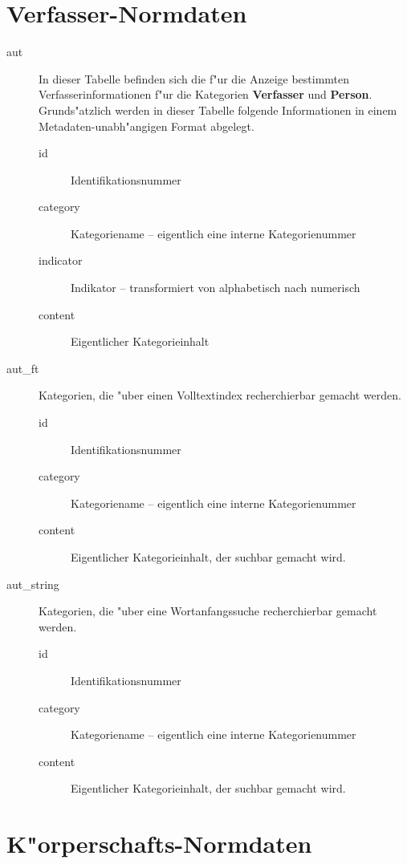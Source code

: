 \documentclass[11pt, twoside, a4paper, BCOR8mm, DIV12, bibtotoc,idxtotoc]{scrbook}
\begin{document}
\begin{itemize}
\section{Verfasser-Normdaten}

\begin{description}
\item[aut] In dieser Tabelle befinden sich die f"ur die Anzeige
  bestimmten Verfasserinformationen f"ur die Kategorien
  \textbf{Verfasser} und \textbf{Person}. Grunds"atzlich werden in
  dieser Tabelle folgende Informationen in einem
  Metadaten-unabh"angigen Format abgelegt.
  \begin{description}
  \item[id] Identifikationsnummer
  \item[category] Kategoriename -- eigentlich eine interne Kategorienummer
  \item[indicator] Indikator -- transformiert von alphabetisch nach numerisch
  \item[content] Eigentlicher Kategorieinhalt
  \end{description}
\item[aut\_ft] Kategorien, die "uber einen Volltextindex recherchierbar
  gemacht werden.
  \begin{description}
  \item[id] Identifikationsnummer
  \item[category] Kategoriename -- eigentlich eine interne Kategorienummer
  \item[content] Eigentlicher Kategorieinhalt, der suchbar gemacht wird.
  \end{description}
\item[aut\_string] Kategorien, die "uber eine Wortanfangssuche
  recherchierbar gemacht werden.
  \begin{description}
  \item[id] Identifikationsnummer
  \item[category] Kategoriename -- eigentlich eine interne Kategorienummer
  \item[content] Eigentlicher Kategorieinhalt, der suchbar gemacht wird.
  \end{description}
\end{description}

\section{K"orperschafts-Normdaten}


\end{itemize}
\end{document}
